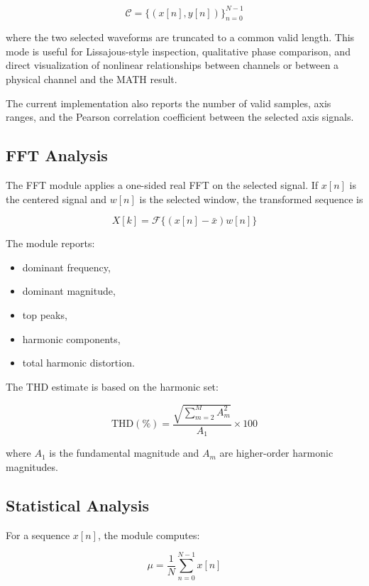 \documentclass[conference]{IEEEtran}
\begin{document}
\begin{equation}
\mathcal{C} = \{(x[n], y[n])\}_{n=0}^{N-1}
\end{equation}

where the two selected waveforms are truncated to a common valid length. This mode is useful for Lissajous-style inspection, qualitative phase comparison, and direct visualization of nonlinear relationships between channels or between a physical channel and the MATH result.

The current implementation also reports the number of valid samples, axis ranges, and the Pearson correlation coefficient between the selected axis signals.

\subsection{FFT Analysis}
The FFT module applies a one-sided real FFT on the selected signal. If $x[n]$ is the centered signal and $w[n]$ is the selected window, the transformed sequence is

\begin{equation}
X[k] = \mathcal{F}\{(x[n] - \bar{x})w[n]\}
\end{equation}

The module reports:

\begin{itemize}
    \item dominant frequency,
    \item dominant magnitude,
    \item top peaks,
    \item harmonic components,
    \item total harmonic distortion.
\end{itemize}

The THD estimate is based on the harmonic set:

\begin{equation}
\mathrm{THD}(\%) = \frac{\sqrt{\sum_{m=2}^{M} A_m^2}}{A_1}\times 100
\end{equation}

where $A_1$ is the fundamental magnitude and $A_m$ are higher-order harmonic magnitudes.

\subsection{Statistical Analysis}
For a sequence $x[n]$, the module computes:

\begin{equation}
\mu = \frac{1}{N}\sum_{n=0}^{N-1} x[n]
\end{equation}
\end{document}

